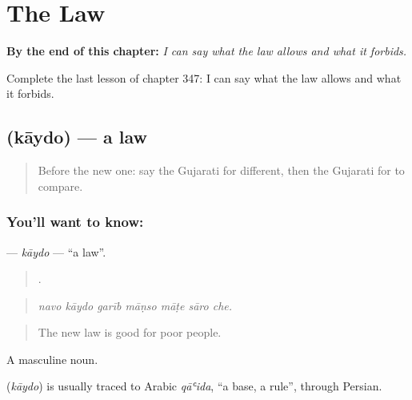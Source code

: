 
\chapter{The Law}
\label{ch:gu-the-law}

\begin{chapteropening}
\textbf{By the end of this chapter:} \emph{I can say what the law allows and what it forbids.}

Complete the last lesson of chapter 347: I can say what the law allows and what it forbids.
\end{chapteropening}

\section[\texorpdfstring{\gu{કાયદો} (kāydo)}{કાયદો (kāydo)}]{ (kāydo) — a law}

\label{lesson:GU-C347-kaydo}



\begin{quote}
Before the new one: say the Gujarati for different, then the Gujarati for to compare.
\end{quote}

\subsection*{You'll want to know: }
\textbf{} — \emph{kāydo} — \textquotedblleft{}a law\textquotedblright{}.

\begin{quote}
      .
\end{quote}

\begin{quote}
\emph{navo kāydo garīb māṇso māṭe sāro che.}
\end{quote}

\begin{quote}
The new law is good for poor people.
\end{quote}

A masculine noun.

\begin{cousinweb}
\textbf{} (\emph{kāydo}) is usually traced to Arabic \emph{qāʿida}, \textquotedblleft{}a base, a rule\textquotedblright{}, through Persian.
\end{cousinweb}

